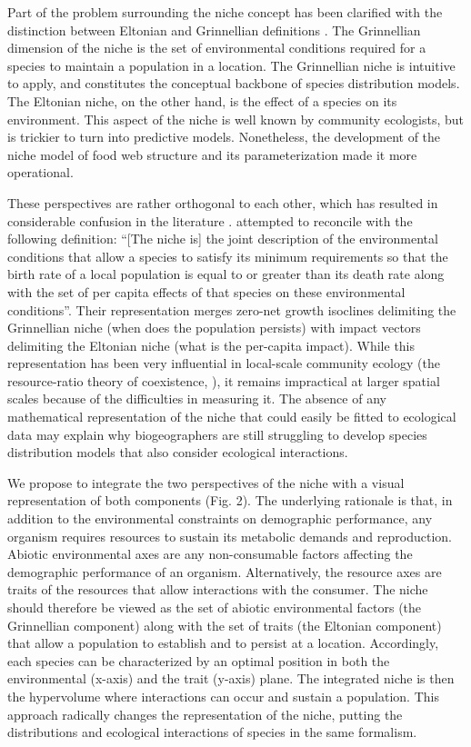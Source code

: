 \documentclass[12pt]{article}
\begin{document}
Part of the problem surrounding the niche concept has been clarified with the
distinction between Eltonian and Grinnellian definitions \citep{Chase2003}. The
Grinnellian dimension of the niche is the set of environmental conditions
required for a species to maintain a population in a location. The Grinnellian
niche is intuitive to apply, and constitutes the conceptual backbone of
species distribution models. The Eltonian niche, on the other hand, is the
effect of a species on its environment. This aspect of the niche is well known
by community ecologists, but is trickier to turn into predictive models.
Nonetheless, the development of the niche model of food web structure
\citep{Williams2000} and its parameterization \citep{Williams2010; Gravel2013}
made it more operational.

These perspectives are rather orthogonal to each other, which has resulted in
considerable confusion in the literature \citep{McInerny2012a}.
\citealt{Chase2003} attempted to reconcile with the following definition:
``[The niche is] the joint description of the environmental conditions that
allow a species to satisfy its minimum requirements so that the birth rate of
a local population is equal to or greater than its death rate along with the
set of per capita effects of that species on these environmental conditions''.
Their representation merges zero-net growth isoclines delimiting the
Grinnellian niche (when does the population persists) with impact vectors delimiting
the Eltonian niche (what is the per-capita impact). While this representation
has been very influential in local-scale community ecology (the resource-ratio
theory of coexistence, \citealt{Tilman1982}), it remains impractical at larger
spatial scales because of the difficulties in measuring it. The absence of any
mathematical representation of the niche that could easily be fitted to
ecological data may explain why biogeographers are still struggling to develop
species distribution models that also consider ecological interactions.

We propose to integrate the two perspectives of the niche with a visual
representation of both components (Fig. 2). The underlying rationale is that, in
addition to the environmental constraints on demographic performance, any
organism requires resources to sustain its metabolic demands and reproduction.
Abiotic environmental axes are any non-consumable factors affecting the
demographic performance of an organism. Alternatively, the resource axes are
traits of the resources that allow interactions with the consumer. The niche
should therefore be viewed as the set of abiotic environmental factors (the
Grinnellian component) along with the set of traits (the Eltonian component)
that allow a population to establish and to persist at a location. Accordingly,
each species can be characterized by an optimal position in both the
environmental (x-axis) and the trait (y-axis) plane. The integrated niche is
then the hypervolume where interactions can occur and sustain a population.
This approach radically changes the representation of the niche, putting the
distributions and ecological interactions of species in the same formalism.
\end{document}
